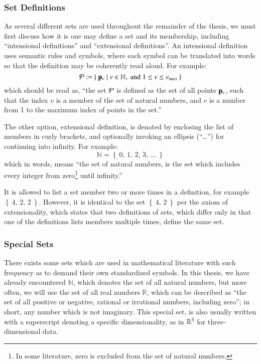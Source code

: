 %
%
\subsubsection{Set Definitions}
\label{ch2sETBssSTsssSD}
As several different sets are used throughout the remainder of the thesis, we must first discuss how it is one may define a set and its membership, including ``intensional definitions'' and ``extensional definitions''. An intensional definition uses semantic rules and symbols, where each symbol can be translated into words so that the definition may be coherently read aloud. For example:
%
\begin{equation}
	\mathcal{P} := \left \{\:\mathbf{p}_v \mid v \in \mathbb{N}, \;\text{and}\; 1\leq v \leq v_{max}\:\right \}
\end{equation}
%
which should be read as, ``the set $\mathcal{P}$ is defined as the set of all points $\mathbf{p}_v$, such that the index $v$ is a member of the set of natural numbers, and $v$ is a number from 1 to the maximum index of points in the set.''

The other option, extensional definition, is denoted by enclosing the list of members in curly brackets, and optionally invoking an ellipsis (``\dots'') for continuing into infinity. For example:
%
\begin{equation}
	\mathbb{N} = \left \{\:0,\,1,\,2,\,3,\,\ldots\:\right \}
\end{equation}
%
which in words, means ``the set of natural numbers, is the set which includes every integer from zero\footnote{In some literature, zero is excluded from the set of natural numbers.} until infinity.''

It is allowed to list a set member two or more times in a definition, for example $\left \{\:4,\,2,\,2\:\right \}$. However, it is identical to the set $\left \{\:4,\,2\:\right \}$ per the axiom of extensionality, which states that two definitions of sets, which differ only in that one of the definitions lists members multiple times, define the same set.

%
%
\subsubsection{Special Sets}
\label{ch2sETBssSTsssSS}
There exists some sets which are used in mathematical literature with such frequency as to demand their own standardized symbols. In this thesis, we have already encountered $\mathbb{N}$, which denotes the set of all natural numbers, but more often, we will use the set of all real numbers $\mathbb{R}$, which can be described as ``the set of all positive or negative, rational or irrational numbers, including zero''; in short, any number which is not imaginary. This special set, is also usually written with a superscript denoting a specific dimensionality, as in $\mathbb{R}^{3}$ for three-dimensional data.

